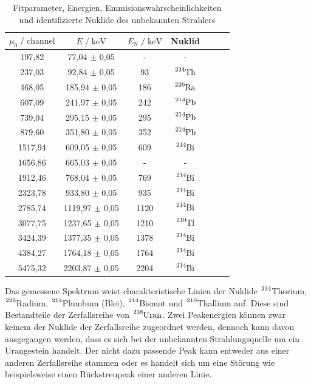 \begin{table}
  \centering
  \caption{Fitparameter, Energien, Emmisionswahrscheinlichkeiten und identifizierte Nuklide des unbekannten Strahlers}
  \label{tab:mess7}
  \begin{tabular}{c c c c c c c}
  \toprule
  $\mu_0 \;/\; \text{channel}$ & $E \;/\; \si{\kilo\eV}$ & $E_\text{N} \;/\; \si{\kilo\eV}$ & Nuklid \\
  \midrule
   197,82 &   77,04 $\pm$ 0,05 &    - &               - \\
   237,03 &   92,84 $\pm$ 0,05 &   93 & $\ce{^{234}Th}$ \\
   468,05 &  185,94 $\pm$ 0,05 &  186 & $\ce{^{226}Ra}$ \\
   607,09 &  241,97 $\pm$ 0,05 &  242 & $\ce{^{214}Pb}$ \\
   739,04 &  295,15 $\pm$ 0,05 &  295 & $\ce{^{214}Pb}$ \\  
   879,60 &  351,80 $\pm$ 0,05 &  352 & $\ce{^{214}Pb}$ \\
  1517,94 &  609,05 $\pm$ 0,05 &  609 & $\ce{^{214}Bi}$ \\
  1656,86 &  665,03 $\pm$ 0,05 &    - &               - \\
  1912,46 &  768,04 $\pm$ 0,05 &  769 & $\ce{^{214}Bi}$ \\
  2323,78 &  933,80 $\pm$ 0,05 &  935 & $\ce{^{214}Bi}$ \\
  2785,74 & 1119,97 $\pm$ 0,05 & 1120 & $\ce{^{214}Bi}$ \\
  3077,75 & 1237,65 $\pm$ 0,05 & 1210 & $\ce{^{210}Tl}$ \\
  3424,39 & 1377,35 $\pm$ 0,05 & 1378 & $\ce{^{214}Bi}$ \\
  4384,27 & 1764,18 $\pm$ 0,05 & 1764 & $\ce{^{214}Bi}$ \\
  5475,32 & 2203,87 $\pm$ 0,05 & 2204 & $\ce{^{214}Bi}$ \\
  \bottomrule
  \end{tabular}
\end{table}


Das gemessene Spektrum weist charakteristische Linien der Nuklide
$\ce{^{234}}$Thorium, $\ce{^{226}}$Radium, $\ce{^{214}}$Plumbum (Blei), $\ce{^{214}}$Bismut und
$\ce{^{210}}$Thallium auf. Diese sind Bestandteile der Zerfallsreihe von $\ce{^{238}Uran}$.
Zwei Peakenergien können zwar keinem der Nuklide der Zerfallsreihe zugeordnet werden, dennoch kann davon ausgegangen
werden, dass es sich bei der unbekannten Strahlungsquelle um ein Urangestein handelt.
Der nicht dazu passende Peak kann entweder aus einer anderen Zerfallsreihe stammen oder es handelt sich um eine Störung
wie beispielsweise einen Rückstreupeak einer anderen Linie.


%


